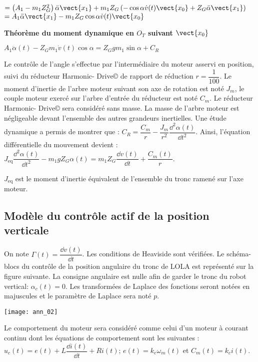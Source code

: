\begin{multicols}{2}
\begin{corrige}
\begin{itemize}
$= \left( A_1-m_1Z_G^2 \right) \ddot{\alpha} \vect{x_1}+m_1 Z_G    \left(-\cos\alpha \dot{v}(t) \vect{x_0} + Z_G \ddot{\alpha}\vect{x_1}   \right) $
$=  A_1\ddot{\alpha} \vect{x_1} - m_1 Z_G    \cos\alpha \dot{v}(t) \vect{x_0}     $
\end{itemize}

\textbf{Théorème du moment dynamique en $O_T$ suivant $\vect{x_0}$}

$A_1 \ddot{\alpha}(t) - Z_G   m_1 \dot{v}(t) \cos \alpha = Z_G gm_1\sin\alpha  +C_R $


\end{corrige}
\else
\fi

\ifprof
\else
Le contrôle de l'angle s'effectue par l'intermédiaire du moteur asservi en position, suivi du réducteur Harmonic-
Drive© de rapport de réduction $r= \dfrac{1}{100}$. Le moment d'inertie de l'arbre moteur suivant son axe de rotation est
noté $J_m$, le couple moteur exercé sur l'arbre d'entrée du réducteur est noté $C_m$. Le réducteur Harmonic-
Drive© sera considéré sans masse. La masse de l'arbre moteur est négligeable devant l'ensemble des autres
grandeurs inertielles. Une étude dynamique a permis de montrer que : $C_R=\dfrac{C_m}{r}-\dfrac{J_m}{r^2}\dfrac{\dd^2\alpha(t)}{\dd t^2}$. Ainsi, l'équation
différentielle du mouvement devient : 
$J_{\text{eq}} \dfrac{\dd^2\alpha(t)}{\dd t^2} -m_1gZ_G\alpha(t)=m_1 Z_G \dfrac{\dd v(t)}{\dd t}+\dfrac{C_m(t)}{r}$.

$J_{\text{eq}}$ est le moment d'inertie équivalent de l'ensemble du tronc ramené sur l'axe moteur.
\fi


\subsection*{Modèle du contrôle actif de la position verticale}
\ifprof
\else
On note $\Gamma(t)=\dfrac{\dd v(t)}{\dd t }$. Les conditions de Heaviside sont vérifiées. Le schéma-blocs du contrôle de la position angulaire du tronc de LOLA est représenté sur la figure suivante. La consigne angulaire est nulle afin de garder le
tronc du robot vertical: $\alpha_c(t)=0$. Les transformées de Laplace des fonctions seront notées en majuscules et
le paramètre de Laplace sera noté $p$.

\begin{center}
\texttt{[image: ann\_02]}
\end{center}



Le comportement du moteur sera considéré comme celui d'un moteur à courant continu dont les équations de
comportement sont les suivantes : $u_c (t)=e(t)+L \dfrac{\dd i(t)}{\dd t} +Ri (t)$; $e(t)=k_e\omega_m(t)$ et $C_m( t)=k_c i(t)$.


\end{multicols}
